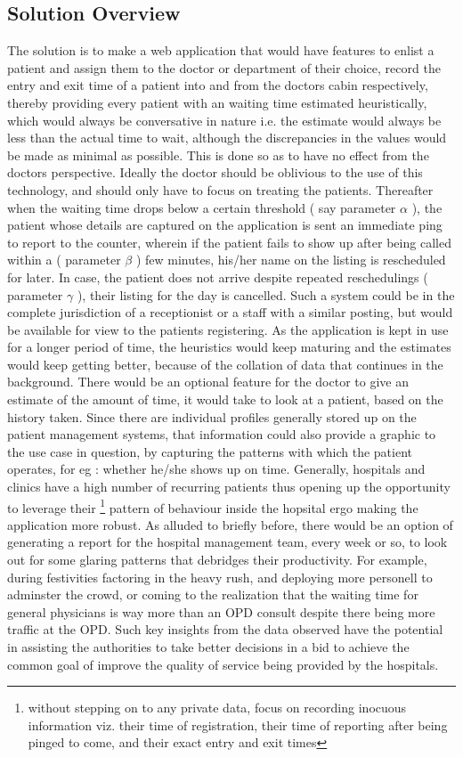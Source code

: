 \documentclass{article}
\begin{document}
\subsection*{Solution Overview}
The solution is to make a web application that would have features to enlist a patient and assign them to the doctor or department of their choice, record the entry and exit time of a patient into and from the doctors cabin respectively, thereby providing every patient with an waiting time estimated heuristically, which would always be conversative in nature i.e. the estimate would always be less than the actual time to wait, although the discrepancies in the values would be made as minimal as possible. This is done so as to have no effect from the doctors perspective. Ideally the doctor should be oblivious to the use of this technology, and should only have to focus on treating the patients. Thereafter when the waiting time drops below a certain threshold ( say parameter $ \alpha $ ), the patient whose details are captured on the application is sent an immediate ping to report to the counter, wherein if the patient fails to show up after being called within a ( parameter $\beta$ )  few minutes, his/her name on the listing is rescheduled for later. In case, the patient does not arrive despite repeated reschedulings ( parameter $\gamma$ ), their listing for the day is cancelled. Such a system could be in the complete jurisdiction of a receptionist or a staff with a similar posting, but would be available for view to the patients registering. As the application is kept in use for a longer period of time, the heuristics would keep maturing and the estimates would keep getting better, because of the collation of data that continues in the background. There would be an optional feature for the doctor to give an estimate of the amount of time, it would take to look at a patient, based on the history taken. Since there are individual profiles generally stored up on the patient management systems, that information could also provide a graphic to the use case in question, by capturing the patterns with which the patient operates, for eg : whether he/she shows up on time. Generally, hospitals and clinics have a high number of recurring patients thus opening up the opportunity to leverage their \footnote{without stepping on to any private data, focus on recording inocuous information viz. their time of registration, their time of reporting after being pinged to come, and their exact entry and exit times} pattern of behaviour inside the hopsital ergo making the application more robust. As alluded to briefly before, there would be an option of generating a report for the hospital management team, every week or so, to look out for some glaring patterns that debridges their productivity. For example, during festivities factoring in the heavy rush, and deploying more personell to adminster the crowd, or coming to the realization that the waiting time for general physicians is way more than an OPD consult despite there being more traffic at the OPD. Such key insights from the data observed have the potential in assisting the authorities to take better decisions in a bid to achieve the  common goal of improve the quality of service being provided by the hospitals.
\end{document}
